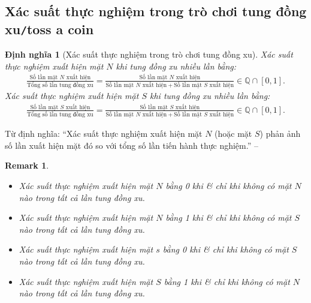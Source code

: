 \documentclass[oneside]{book}
\numberwithin{equation}{section}
\newtheorem{dinhnghia}{Định nghĩa}[section]
\newtheorem{remark}{Remark}[section]
\begin{document}
\subsection{Xác suất thực nghiệm trong trò chơi tung đồng xu\texttt{/}toss a coin}
\begin{dinhnghia}[Xác suất thực nghiệm trong trò chơi tung đồng xu]
	\emph{Xác suất thực nghiệm xuất hiện mặt $N$} khi tung đồng xu nhiều lần bằng:
	\begin{align*}
		\frac{\mbox{Số lần mặt $N$ xuất hiện}}{\mbox{Tổng số lần tung đồng xu}} = \frac{\mbox{Số lần mặt $N$ xuất hiện}}{\mbox{Số lần mặt $N$ xuất hiện} + \mbox{Số lần mặt $S$ xuất hiện}}\in\mathbb{Q}\cap[0,1].
	\end{align*}
	\emph{Xác suất thực nghiệm xuất hiện mặt $S$} khi tung đồng xu nhiều lần bằng:
	\begin{align*}
		\frac{\mbox{Số lần mặt $S$ xuất hiện}}{\mbox{Tổng số lần tung đồng xu}} = \frac{\mbox{Số lần mặt $S$ xuất hiện}}{\mbox{Số lần mặt $N$ xuất hiện} + \mbox{Số lần mặt $S$ xuất hiện}}\in\mathbb{Q}\cap[0,1].
	\end{align*}
\end{dinhnghia}
Từ định nghĩa: ``Xác suất thực nghiệm xuất hiện mặt $N$ (hoặc mặt $S$) phản ảnh số lần xuất hiện mặt đó so với tổng số lần tiến hành thực nghiệm.'' -- \cite[p. 18]{Thai_Anh_Dat_Ha_Loan_Nam_Quang_Toan_6_tap_2}

\begin{remark}
	\begin{itemize}
		\item Xác suất thực nghiệm xuất hiện mặt $N$ bằng 0 khi \textit{\&} chỉ khi không có mặt $N$ nào trong tất cả lần tung đồng xu.
		\item Xác suất thực nghiệm xuất hiện mặt $N$ bằng 1 khi \textit{\&} chỉ khi không có mặt $S$ nào trong tất cả lần tung đồng xu.
		\item Xác suất thực nghiệm xuất hiện mặt $s$ bằng 0 khi \textit{\&} chỉ khi không có mặt $S$ nào trong tất cả lần tung đồng xu.
		\item Xác suất thực nghiệm xuất hiện mặt $S$ bằng 1 khi \textit{\&} chỉ khi không có mặt $N$ nào trong tất cả lần tung đồng xu.
	\end{itemize}
\end{remark}
\end{document}

